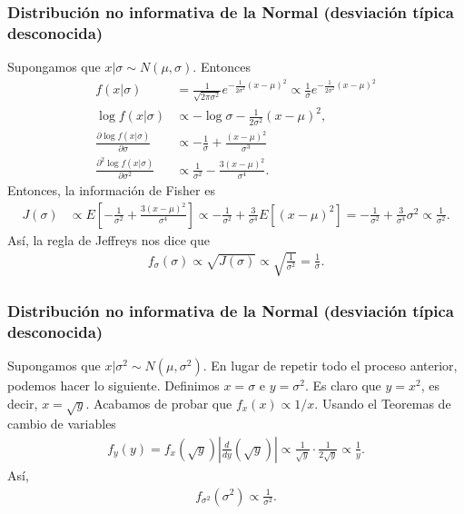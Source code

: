 \subsubsection{Distribución no informativa de la Normal (desviación típica desconocida)}
\noindent Supongamos que $x | \sigma \sim N(\mu,\sigma)$. Entonces 
\begin{align*}
    f(x | \sigma) &= \frac{1}{\sqrt{2\pi\sigma^2}}e^{-\frac{1}{2\sigma^2}(x-\mu)^2} \propto \frac{1}{\sigma} e^{-\frac{1}{2\sigma^2}(x-\mu)^2}  \\
     \log f(x | \sigma) & \propto - \log \sigma - \frac{1}{2\sigma^2}(x-\mu)^2   , \\
     \frac{\partial \log f(x | \sigma)}{\partial \sigma} & \propto - \frac{1}{\sigma} + \frac{(x-\mu)^2}{\sigma^3}\\
     \frac{\partial^2 \log f(x | \sigma)}{\partial \sigma^2} & \propto \frac{1}{\sigma^2} - \frac{3(x-\mu)^2}{\sigma^4} .
\end{align*}
Entonces, la información de Fisher es
\begin{align*}
    J(\sigma) & \propto E\left[ -\frac{1}{\sigma^2} + \frac{3(x-\mu)^2}{\sigma^4} \right] \propto -\frac{1}{\sigma^2} + \frac{3}{\sigma^4} E\left[ (x-\mu)^2\right] = - \frac{1}{\sigma^2} + \frac{3}{\sigma^4}\sigma^2 \propto \frac{1}{\sigma^2}.
\end{align*}
Así, la regla de Jeffreys nos dice que
\begin{align*}
    f_{\sigma}(\sigma) \propto \sqrt{J(\sigma)} \propto \sqrt{\frac{1}{\sigma^2}} = \frac{1}{\sigma}.
\end{align*}

\subsubsection{Distribución no informativa de la Normal (desviación típica desconocida)}
\noindent Supongamos que $x | \sigma^2 \sim N(\mu,\sigma^2)$. En lugar de repetir todo el proceso anterior, podemos hacer lo siguiente. Definimos $x = \sigma$ e $y = \sigma^2$. Es claro que $y = x^2$, es decir, $x = \sqrt{y}$. Acabamos de probar que $f_{x}(x) \propto 1/x$. Usando el Teoremas de cambio de variables
\begin{align*}
    f_y(y) = f_x\left( \sqrt{y} \right) \left| \frac{d}{dy} \left( \sqrt{y} \right) \right| \propto \frac{1}{\sqrt{y}} \cdot \frac{1}{2\sqrt{y}} \propto \frac{1}{y}.
\end{align*}
Así,
\begin{align*}
    f_{\sigma^2}(\sigma^2) \propto \frac{1}{\sigma^2}.
\end{align*}

